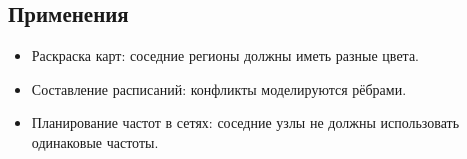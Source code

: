 {\subsection*{Применения}

\begin{itemize}
  \item Раскраска карт: соседние регионы должны иметь разные цвета.
  \item Составление расписаний: конфликты моделируются рёбрами.
  \item Планирование частот в сетях: соседние узлы не должны использовать одинаковые частоты.
\end{itemize}


    \newpage
}
